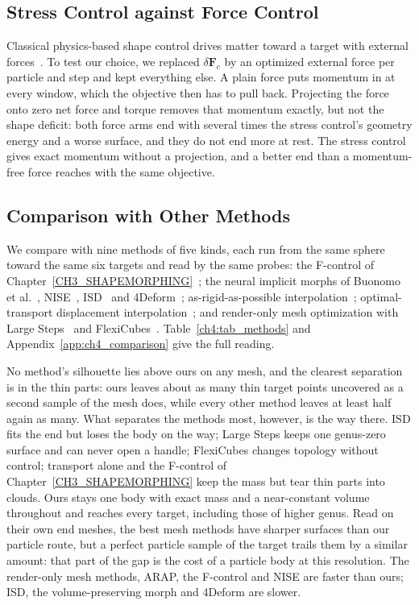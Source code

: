 \subsection{Stress Control against Force Control}
\label{ch4:sec_force}
Classical physics-based shape control drives matter toward a target with external
forces~\citep{treuille2003keyframe,mcnamara2004adjoint,fattal2004targetdriven,chen2024eigenfluids,li2025flowmapadjoint}.
To test our choice, we replaced $\delta\mathbf{F}_c$ by an optimized external force per particle and step and kept
everything else. A plain force puts momentum in at every window, which the objective then has to pull back. Projecting the
force onto zero net force and torque removes that momentum exactly, but not the shape deficit: both force arms end with
several times the stress control's geometry energy and a worse surface, and they do not end more at rest. The stress
control gives exact momentum without a projection, and a better end than a momentum-free force reaches with the same
objective.

\subsection{Comparison with Other Methods}
\label{ch4:sec_comparison}
We compare with nine methods of five kinds, each run from the same sphere toward the same six targets and read by the same
probes: the F-control of Chapter~\ref{CH3_SHAPEMORPHING}~\citep{11088224}; the neural implicit morphs of Buonomo et
al.~\citep{buonomo2025vpnsm}, NISE~\citep{novello2023nise}, ISD~\citep{sang2025isd} and 4Deform~\citep{sang2025fourdeform};
as-rigid-as-possible interpolation~\citep{alexa2000arap}; optimal-transport displacement
interpolation~\citep{mccann1997convexity,bonneel2011displacement}; and render-only mesh optimization with Large
Steps~\citep{nicolet2021largesteps} and FlexiCubes~\citep{shen2023flexicubes}. Table~\ref{ch4:tab_methods} and
Appendix~\ref{app:ch4_comparison} give the full reading.

No method's silhouette lies above ours on any mesh, and the clearest separation is in the thin parts: ours leaves about as
many thin target points uncovered as a second sample of the mesh does, while every other method leaves at least half
again as many. What separates the methods most, however, is the way there. ISD fits the end but loses the body on the way;
Large Steps keeps one genus-zero surface and can never open a handle; FlexiCubes changes topology without control;
transport alone and the F-control of Chapter~\ref{CH3_SHAPEMORPHING} keep the mass but tear thin parts into clouds. Ours
stays one body with exact mass and a near-constant volume throughout and reaches every target, including those of higher
genus. Read on their own end meshes, the best mesh methods have sharper surfaces than our particle route, but a perfect
particle sample of the target trails them by a similar amount: that part of the gap is the cost of a particle body at this
resolution. The render-only mesh methods, ARAP, the F-control and NISE are faster than ours; ISD, the volume-preserving
morph and 4Deform are slower.

